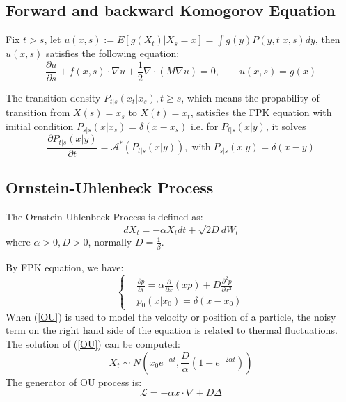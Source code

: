 \subsection{Forward and backward Komogorov Equation}
\begin{theorem}
    Fix $t>s$, let $u(x, s):= E\left[g(X_t)|X_s=x\right]=\int g(y)P(y, t|x, s)dy$, then $u(x, s)$ satisfies the following equation:
    \begin{equation}
        \frac{\partial u}{\partial s}+f(x, s)\cdot \nabla u+\frac{1}{2}\nabla \cdot (M\nabla u)=0, \qquad u(x, s)=g(x)
    \end{equation}
\end{theorem}

\begin{theorem}
     The transition density $P_{t|s}(x_t|x_s),t\geq s$, which means the propability of transition from $X(s)=x_s$ to $X(t)=x_t$, satisfies the FPK equation with initial condition $P_{s|s}(x|x_s)=\delta(x-x_s)$
     i.e. for $P_{t|s}(x|y)$, it solves
     \begin{equation}
        \frac{\partial P_{t|s}(x|y)}{\partial t}=\mathcal{A}^*(P_{t|s}(x|y)), \operatorname{with} P_{s|s}(x|y)=\delta(x-y)
     \end{equation}
\end{theorem}




\subsection{Ornstein-Uhlenbeck Process}
\begin{definition}
    The Ornstein-Uhlenbeck Process is defined as:
    \begin{equation}
        dX_t = -\alpha X_t dt+\sqrt{2D} dW_t
    \end{equation}
    where $\alpha>0, D>0$, normally $D = \frac{1}{\beta}$.
\end{definition}
By FPK equation, we have:
\begin{equation}\left\{
    \begin{aligned}
        &\frac{\partial p}{\partial t} = \alpha \frac{\partial}{\partial x}(xp)+D\frac{\partial^2 p}{\partial x^2}\\
        &p_{0}(x|x_0) = \delta(x-x_0)
    \end{aligned}\right.\label{OU}
\end{equation}
When (\ref{OU}) is  used to model the velocity or position of a particle, the noisy term on the right hand side of the equation is related to thermal fluctuations.
The solution of (\ref{OU}) can be computed:
\begin{equation}
    X_t \sim N(x_0e^{-\alpha t}, \frac{D}{\alpha}(1-e^{-2\alpha t}))
\end{equation}
The generator of OU process is:
\begin{equation}
    \mathcal{L}=-\alpha x\cdot \nabla +D\Delta
\end{equation}


